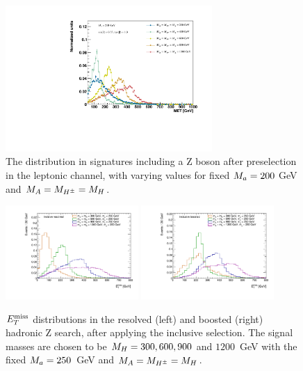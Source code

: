 \begin{figure}%
	\centering

	\centering
	\includegraphics[width=0.7\textwidth]{texinputs/04_grid/figures/monoz/leptonic/mAscan_for_ma200_axis.pdf}	
	\caption{The \MET distribution in signatures including a Z boson after preselection in the leptonic channel, with varying \mH values for fixed $M_{a} = 200$ GeV and $M_{A} = M_{H^{\pm}} = M_{H}$. \label{fig:monoz_ll_mA_scan}}

\end{figure}

\begin{figure}
\centering

\includegraphics[width=0.45\textwidth]{texinputs/04_grid/figures/monoz/hadronic/ma250_incl_resl_MET_linear.pdf}
\includegraphics[width=0.45\textwidth]{texinputs/04_grid/figures/monoz/hadronic/ma250_incl_merged_MET_linear.pdf}
\caption{$E_T^\mathrm{miss}$ distributions in the resolved (left) and boosted (right) hadronic Z search, after applying the inclusive selection. 
The signal masses are chosen to be $M_{H} = 300, 600, 900$ and $1200$~GeV with the fixed $M_{a} = 250$~GeV and $M_{A} = M_{H^{\pm}} = M_{H}$.
\label{fig:monozhad_kin_inc_fixed_ma}}

\end{figure}

